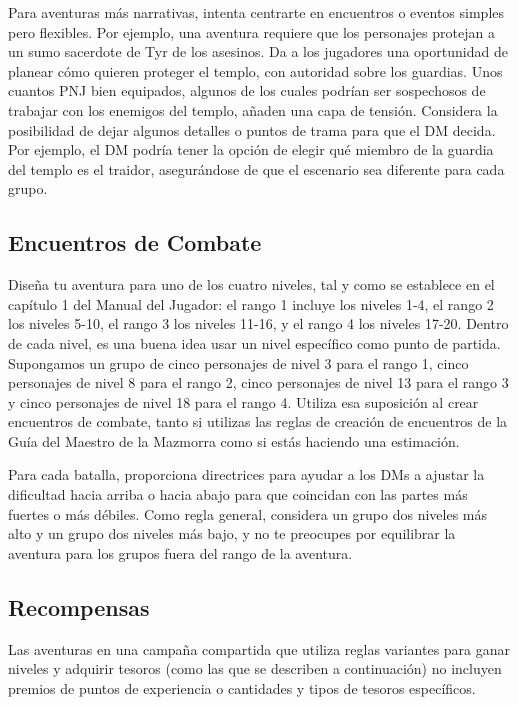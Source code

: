 \documentclass[a4paper,twocolumn,openany,10pt]{dndbook}
\begin{document}
Para aventuras más narrativas, intenta centrarte en encuentros o eventos simples pero flexibles. Por ejemplo, una aventura
requiere que los personajes protejan a un sumo sacerdote de Tyr de los asesinos. Da a los jugadores una oportunidad de planear
cómo quieren proteger el templo, con autoridad sobre los guardias. Unos cuantos PNJ bien equipados, algunos de los cuales
podrían ser sospechosos de trabajar con los enemigos del templo, añaden una capa de tensión. Considera la posibilidad de dejar
algunos detalles o puntos de trama para que el DM decida. Por ejemplo, el DM podría tener la opción de elegir qué miembro de la
guardia del templo es el traidor, asegurándose de que el escenario sea diferente para cada grupo. 

\subsection*{Encuentros de Combate}
Diseña tu aventura para uno de los cuatro niveles, tal y como se establece en el capítulo 1 del Manual del Jugador: el rango 1
incluye los niveles 1-4, el rango 2 los niveles 5-10, el rango 3 los niveles 11-16, y el rango 4 los niveles 17-20. Dentro de
cada nivel, es una buena idea usar un nivel específico como punto de partida. Supongamos un grupo de cinco personajes de nivel 3
para el rango 1, cinco personajes de nivel 8 para el rango 2, cinco personajes de nivel 13 para el rango 3 y cinco personajes de
nivel 18 para el rango 4. Utiliza esa suposición al crear encuentros de combate, tanto si utilizas las reglas de creación de
encuentros de la Guía del Maestro de la Mazmorra como si estás haciendo una estimación.

Para cada batalla, proporciona directrices para ayudar a los DMs a ajustar la dificultad hacia arriba o hacia abajo para que
coincidan con las partes más fuertes o más débiles. Como regla general, considera un grupo dos niveles más alto y un grupo dos
niveles más bajo, y no te preocupes por equilibrar la aventura para los grupos fuera del rango de la aventura.

\subsection*{Recompensas}
Las aventuras en una campaña compartida que utiliza reglas variantes para ganar niveles y adquirir tesoros (como las que se
describen a continuación) no incluyen premios de puntos de experiencia o cantidades y tipos de tesoros específicos. 
\end{document}
